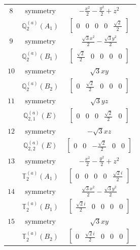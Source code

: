 \documentclass[fleqn,8pt,landscape]{jsarticle}
\begin{document}
\begin{longtable}{ccc}
$ 8 $ & $ \text{symmetry} $ & $ - \frac{x^{2}}{2} - \frac{y^{2}}{2} + z^{2} $ \\
$  $ & $ \mathbb{Q}_{2}^{(a)}(A_{1}) $ & $ \begin{bmatrix} 0 & 0 & 0 & 0 & \frac{\sqrt{2}}{2} \end{bmatrix} $ \\ \hline
$ 9 $ & $ \text{symmetry} $ & $ \frac{\sqrt{3} x^{2}}{2} - \frac{\sqrt{3} y^{2}}{2} $ \\
$  $ & $ \mathbb{Q}_{2}^{(a)}(B_{1}) $ & $ \begin{bmatrix} \frac{\sqrt{2}}{2} & 0 & 0 & 0 & 0 \end{bmatrix} $ \\ \hline
$ 10 $ & $ \text{symmetry} $ & $ \sqrt{3} x y $ \\
$  $ & $ \mathbb{Q}_{2}^{(a)}(B_{2}) $ & $ \begin{bmatrix} 0 & \frac{\sqrt{2}}{2} & 0 & 0 & 0 \end{bmatrix} $ \\ \hline
$ 11 $ & $ \text{symmetry} $ & $ \sqrt{3} y z $ \\
$  $ & $ \mathbb{Q}_{2,1}^{(a)}(E) $ & $ \begin{bmatrix} 0 & 0 & 0 & \frac{\sqrt{2}}{2} & 0 \end{bmatrix} $ \\ \hline
$ 12 $ & $ \text{symmetry} $ & $ - \sqrt{3} x z $ \\
$  $ & $ \mathbb{Q}_{2,2}^{(a)}(E) $ & $ \begin{bmatrix} 0 & 0 & - \frac{\sqrt{2}}{2} & 0 & 0 \end{bmatrix} $ \\ \hline
$ 13 $ & $ \text{symmetry} $ & $ - \frac{x^{2}}{2} - \frac{y^{2}}{2} + z^{2} $ \\
$  $ & $ \mathbb{T}_{2}^{(a)}(A_{1}) $ & $ \begin{bmatrix} 0 & 0 & 0 & 0 & \frac{\sqrt{2} i}{2} \end{bmatrix} $ \\ \hline
$ 14 $ & $ \text{symmetry} $ & $ \frac{\sqrt{3} x^{2}}{2} - \frac{\sqrt{3} y^{2}}{2} $ \\
$  $ & $ \mathbb{T}_{2}^{(a)}(B_{1}) $ & $ \begin{bmatrix} \frac{\sqrt{2} i}{2} & 0 & 0 & 0 & 0 \end{bmatrix} $ \\ \hline
$ 15 $ & $ \text{symmetry} $ & $ \sqrt{3} x y $ \\
$  $ & $ \mathbb{T}_{2}^{(a)}(B_{2}) $ & $ \begin{bmatrix} 0 & \frac{\sqrt{2} i}{2} & 0 & 0 & 0 \end{bmatrix} $ \\ \hline

\end{longtable}
\end{document}
